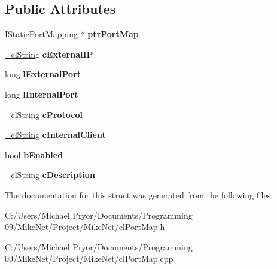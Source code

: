 \subsection*{Public Attributes}
\begin{DoxyCompactItemize}
\item 
\hypertarget{structcl_port_map_abad80406ad9695d1933de5b640c2463f}{
IStaticPortMapping $\ast$ {\bfseries ptrPortMap}}
\label{structcl_port_map_abad80406ad9695d1933de5b640c2463f}

\item 
\hypertarget{structcl_port_map_a5482c8e8de1f3c043528320ed2e36acd}{
\hyperlink{struct__cl_string}{\_\-clString} {\bfseries cExternalIP}}
\label{structcl_port_map_a5482c8e8de1f3c043528320ed2e36acd}

\item 
\hypertarget{structcl_port_map_ab762d0cbc01b580d83d449b94854c678}{
long {\bfseries lExternalPort}}
\label{structcl_port_map_ab762d0cbc01b580d83d449b94854c678}

\item 
\hypertarget{structcl_port_map_a684fcf5588902948afa9447ad7747671}{
long {\bfseries lInternalPort}}
\label{structcl_port_map_a684fcf5588902948afa9447ad7747671}

\item 
\hypertarget{structcl_port_map_abf187dfc7330de4c9b2e7d05bf1d11a5}{
\hyperlink{struct__cl_string}{\_\-clString} {\bfseries cProtocol}}
\label{structcl_port_map_abf187dfc7330de4c9b2e7d05bf1d11a5}

\item 
\hypertarget{structcl_port_map_ab620dffa86ee9cdf3ea2c5216c900367}{
\hyperlink{struct__cl_string}{\_\-clString} {\bfseries cInternalClient}}
\label{structcl_port_map_ab620dffa86ee9cdf3ea2c5216c900367}

\item 
\hypertarget{structcl_port_map_ad48089f20bb6922a6e60f9d2c53277da}{
bool {\bfseries bEnabled}}
\label{structcl_port_map_ad48089f20bb6922a6e60f9d2c53277da}

\item 
\hypertarget{structcl_port_map_a6a94ef228f3aadbab0dd02ffe285a812}{
\hyperlink{struct__cl_string}{\_\-clString} {\bfseries cDescription}}
\label{structcl_port_map_a6a94ef228f3aadbab0dd02ffe285a812}

\end{DoxyCompactItemize}


The documentation for this struct was generated from the following files:\begin{DoxyCompactItemize}
\item 
C:/Users/Michael Pryor/Documents/Programming 09/MikeNet/Project/MikeNet/clPortMap.h\item 
C:/Users/Michael Pryor/Documents/Programming 09/MikeNet/Project/MikeNet/clPortMap.cpp\end{DoxyCompactItemize}
